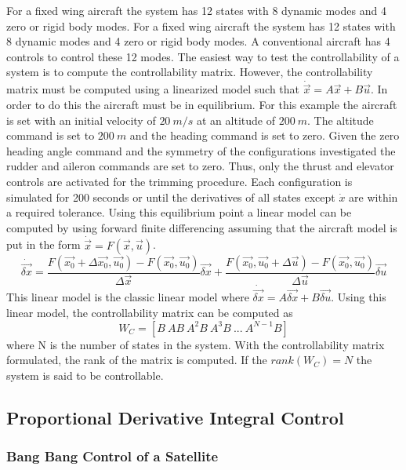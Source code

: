 For a fixed wing aircraft the system has 12 states with 8 dynamic
modes and 4 zero or rigid body modes. For a fixed wing aircraft the system has 12 states with 8 dynamic
modes and 4 zero or rigid body modes. A conventional aircraft has 4
controls to control these 12 modes. The easiest way to test the 
controllability of a system  is to compute the
controllability matrix. However, the controllability matrix must be
computed using a linearized model such that
$\dot{\vec{x}}=A\vec{x}+B\vec{u}$. In order to do this the aircraft
must be in equilibrium. For this example the aircraft is
set with an initial velocity of $20~m/s$ at an altitude of
$200~m$. The altitude command is set to $200~m$ and the heading
command is set to zero. Given the zero heading angle command and the
symmetry of the configurations investigated the rudder and aileron
commands are set to zero. Thus, only the thrust and elevator controls
are activated for the trimming procedure. Each configuration is
simulated for 200 seconds or until the derivatives of all states
except $\dot{x}$ are within a required tolerance. Using this
equilibrium point a linear model can be computed by using forward
finite differencing assuming that the
aircraft model is put in the form $\dot{\vec{x}} = F(\vec{x},\vec{u})$.
\begin{equation}
\dot{\vec{\delta x}} = \frac{F(\vec{x_0}+\Delta \vec{x_0},\vec{u_0})-F(\vec{x_0},\vec{u_0})}{\Delta
  \vec{x}}\vec{\delta x} + \frac{F(\vec{x_0},\vec{u_0}+\Delta
  \vec{u})-F(\vec{x_0},\vec{u_0})}{\Delta \vec{u}}\vec{\delta u}
\end{equation}
This linear model is the classic linear model where
$\dot{\vec{\delta x}}=A\vec{\delta{x}}+B\vec{\delta{u}}$. Using this linear model, the
controllability matrix can be computed as
\begin{equation}
W_C = [B~AB~A^2B~A^3B~...~A^{N-1}B]
\end{equation}
where N is the number of states in the system. With the controllability
matrix formulated, the rank of the matrix is computed. If the
$rank(W_C)=N$ the system is said to be controllable.

\subsection{Proportional Derivative Integral Control}

\subsubsection{Bang Bang Control of a Satellite}

